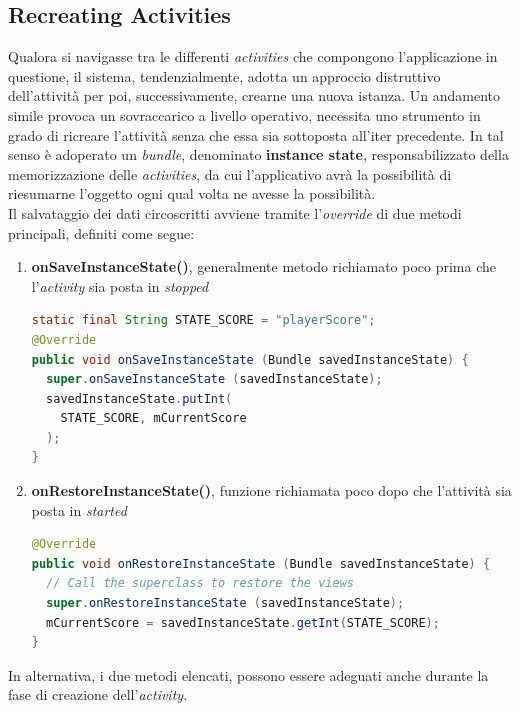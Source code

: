 \documentclass{article}
\begin{document}
\subsection*{Recreating Activities}
Qualora si navigasse tra le differenti \textit{activities} che compongono l'applicazione in questione, il sistema, tendenzialmente, adotta un approccio distruttivo dell'attività per poi, successivamente, crearne una nuova istanza. Un andamento simile provoca un sovraccarico a livello operativo, necessita uno strumento in grado di ricreare l'attività senza che essa sia sottoposta all'iter precedente. In tal senso è adoperato un \textit{bundle}, denominato \textbf{instance state}, responsabilizzato della memorizzazione delle \textit{activities}, da cui l'applicativo avrà la possibilità di riesumarne l'oggetto ogni qual volta ne avesse la possibilità.\vspace*{14pt}\\
Il salvataggio dei dati circoscritti avviene tramite l'\textit{override} di due metodi principali, definiti come segue:
\begin{enumerate}
  \itemsep0em 
  \renewcommand{\labelenumi}{ }
  \item \textbf{onSaveInstanceState()}, generalmente metodo richiamato poco prima che l'\textit{activity} sia posta in \textit{stopped}
  \begin{lstlisting}[language=JAVA, title=Salvataggio dei dati poco prima dello stato stopped]
static final String STATE_SCORE = "playerScore";
@Override
public void onSaveInstanceState (Bundle savedInstanceState) {
  super.onSaveInstanceState (savedInstanceState);
  savedInstanceState.putInt(
    STATE_SCORE, mCurrentScore
  );
}
  \end{lstlisting}
  \item \textbf{onRestoreInstanceState()}, funzione richiamata poco dopo che l'attività sia posta in \textit{started}
  \begin{lstlisting}[language=JAVA, title=Salvataggio dei dati poco dopo dello stato started]
@Override
public void onRestoreInstanceState (Bundle savedInstanceState) {
  // Call the superclass to restore the views
  super.onRestoreInstanceState (savedInstanceState);
  mCurrentScore = savedInstanceState.getInt(STATE_SCORE);
}
  \end{lstlisting}
\end{enumerate}
In alternativa, i due metodi elencati, possono essere adeguati anche durante la fase di creazione dell'\textit{activity}. 
\end{document}
